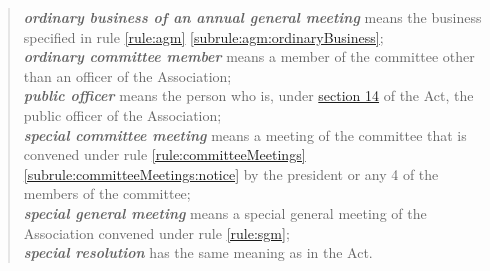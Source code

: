 \begin{quote}
	\textit{\textbf{ordinary business of an annual general meeting}} means the business specified in rule \ref{rule:agm} \ref{subrule:agm:ordinaryBusiness};\\
	\textit{\textbf{ordinary committee member}} means a member of the committee other than an officer of the Association;\\
	\textit{\textbf{public officer}} means the person who is, under \href{https://www.legislation.tas.gov.au/view/html/inforce/2019-05-06/act-1964-064#GS14@EN}{section 14} of the Act, the public officer of the Association;\\
	\textit{\textbf{special committee meeting}} means a meeting of the committee that is convened under rule \ref{rule:committeeMeetings} \ref{subrule:committeeMeetings:notice} by the president or any 4 of the members of the committee;\\
	\textit{\textbf{special general meeting}} means a special general meeting of the Association convened under rule \ref{rule:sgm};\\
	\textit{\textbf{special resolution}}	 has the same meaning as in the Act.
\end{quote}